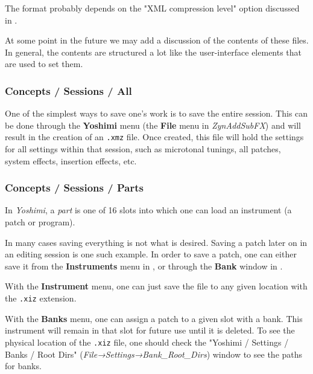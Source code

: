    The format probably depends on the "XML compression level" option
   discussed in
   .

   At some point in the future we may add a discussion of the contents of
   these files.  In general, the contents are structured a lot like the
   user-interface elements that are used to set them.

\subsubsection{Concepts / Sessions / All}
\label{subsec:concepts_sessions_all}

   One of the simplest ways to save one's work is to save the entire session.
   This can be done through the \textbf{Yoshimi} menu
   (the \textbf{File} menu in \textsl{ZynAddSubFX})
   and will result in the creation of
   an \texttt{.xmz} file. Once created, this file will hold the settings for
   all settings within that session, such as microtonal tunings, all
   patches, system effects, insertion effects, etc.

\subsubsection{Concepts / Sessions / Parts}
\label{subsec:concepts_sessions_parts}

   In \textsl{Yoshimi}, a \textsl{part} is one of 16 slots into which one
   can load an instrument (a patch or program).

   In many cases saving everything is not what is desired. Saving a patch
   later on in an editing session is one such example.
   In order to save a patch, one can either save it from the
   \textbf{Instruments} menu
   in ,
   or through the \textbf{Bank} window in
   .

   With the \textbf{Instrument} menu, one can just save the file to any
   given location with the \texttt{.xiz} extension.

   With the \textbf{Banks} menu, one can assign a patch to a given slot with
   a bank.  This instrument will remain in that slot for future use until it is
   deleted. To see the physical location of the \texttt{.xiz} file, one
   should check the
   "Yoshimi / Settings / Banks / Root Dirs"
   (\textsl{File→Settings→Bank\_Root\_Dirs}) window to see the paths for
   banks.

